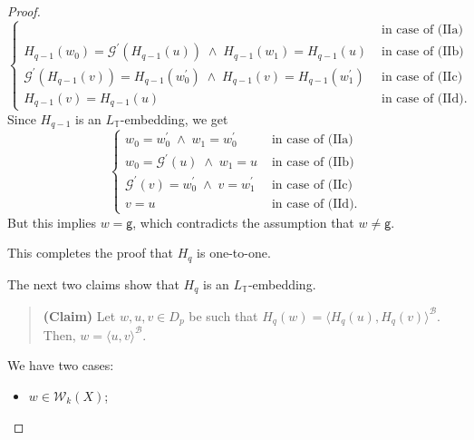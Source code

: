 \documentclass[10pt,a4paper, openany,  oldfontcommands]{memoir}
\newtheorem{open problem} [theorem] {Open Problem}
\newtheorem{open question} [theorem] {Open Question}
\begin{document}
\begin{proof}
\[\begin{cases}
 &      \mbox{ in case of (IIa)}
\\
  H_{q-1} (w_0)  = \mathcal{G}^{  \prime }   \left(  H_{q-1}   (u)  \right)    
    \;  \wedge  \;     H_{q-1} (w_1)   =  H_{q-1}   \left( u  \right)
    &      \mbox{ in case of (IIb)}
\\
\mathcal{G}^{  \prime }     \left(    H_{q-1}   (v)   \right)    =    H_{q-1}   \left( w^{ \prime }_0 \right) 
\;  \wedge   \;   
   H_{q-1} (v)   =  H_{q-1}   \left(   w^{ \prime }_1  \right)
 &      \mbox{ in case of (IIc)} 
 \\
 H_{q-1}   (v)     =    H_{q-1}   (u)     &   \mbox{ in case of  (IId).}
\end{cases}
\]
Since  $ H_{ q-1}  $  is  an   $  L_{  \mathbb{T}  } $-embedding, we get 
 \[
 \begin{cases}
w_0 =  w^{ \prime }_0   \;  \wedge  \;   w_1 =  w^{ \prime }_0 

 &      \mbox{ in case of (IIa)}
\\
w_0  = \mathcal{G}^{  \prime }   \left( u   \right)    
    \;  \wedge  \;    w_1  =  u  
    &      \mbox{ in case of (IIb)}
\\
\mathcal{G}^{  \prime }     \left(    v \right)    =      w^{ \prime }_0 
\;  \wedge   \;   
v   =  w^{ \prime }_1 
 &      \mbox{ in case of (IIc)} 
 \\
v =  u    &   \mbox{ in case of  (IId).}
\end{cases}
\]
 But this implies  $  w  = \mathsf{g}   $, which  contradicts the assumption that   $  w  \neq  \mathsf{g}  $.
  
  
  
  
  
This completes the proof that  $  H_q  $  is one-to-one.   
 
 
 
 The next two claims show that    $  H_q  $   is an  $  L_{  \mathbb{T}  }  $-embedding. 
  
  
  
     \begin{quote} {\bf (Claim)} \;\;\;\;\;\;    
     Let   $   w,  u,  v   \in D_p $  be such that  $  H_q (w)  =  \langle  H_q(u) , H_q (v)  \rangle^{  \mathcal{B}  }  $.
 Then,  $  w  =   \langle u, v  \rangle^{  \mathcal{B}  }  $.
 \end{quote}  
  
  We  have two cases: 
  \begin{itemize}
\item[(III)]   $  w  \in  \mathcal{W}_k  \left( X  \right)  $; 



\end{itemize}
\end{proof}
\end{document}
